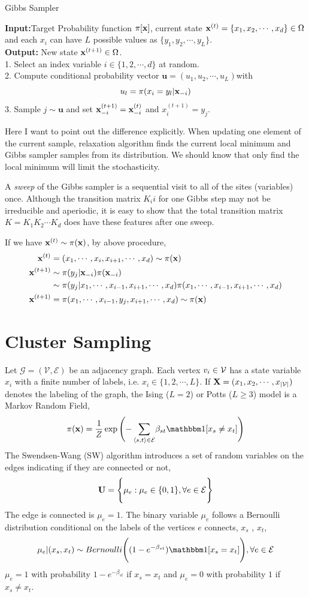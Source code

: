 \documentclass{article}
\begin{document}
\begin{algorithm}
\caption{Gibbs Sampler}
\label{algo:gibbs}
    \textbf{Input:}Target Probability function $\pi[\mathbf{x}]$, current state $\mathbf{x}^{(t)}=\{x_1,x_2,\cdots,x_d\}\in\Omega$ and each $x_i$ can have $L$ possible values as $\{y_1,y_2,\cdots,y_L\}$.\\
    \textbf{Output:} New state $\mathbf{x}^{(t+1)}\in\Omega$.\\
    1. Select an index variable $i\in\{1,2,\cdots,d\}$ at random.\\
    2. Compute conditional probability vector $\mathbf{u}=(u_1,u_2,\cdots,u_L)$with 
    \[u_l=\pi(x_i=y_l|\mathbf{x}_{-i})\]
    3. Sample $j\sim\mathbf{u}$ and set $\mathbf{x}^{(t+1)}_{-i}=\mathbf{x}^{(t)}_{-i}$ and $x^{(t+1)}_{i}=y_j$.
\end{algorithm}

Here I want to point out the difference explicitly. When updating one element of the current sample, relaxation algorithm finds the current local minimum and Gibbs sampler samples from its distribution. We should know that only find the local minimum will limit the stochasticity.

A \textit{sweep} of the Gibbs sampler is a sequential visit to all of the sites (variables) once.
Although the transition matrix $K_ii$ for one Gibbs step may not be irreducible and aperiodic, it is easy to show that the total transition matrix $K = K_1K_2\cdots K_d$ does have these features after one sweep. 

If we have $\mathbf{x}^{(t)}\sim\pi(\mathbf{x})$, by above procedure,
\begin{align*}
\mathbf{x}^{(t)}&=(x_1,\cdots,x_i,x_{i+1},\cdots,x_d)\sim \pi(\mathbf{x})\\
\mathbf{x}^{(t+1)}&\sim\pi(y_j|\mathbf{x}_{-i})\pi(\mathbf{x}_{-i})\\
&\sim\pi(y_j|x_1,\cdots,x_{i-1},x_{i+1},\cdots,x_d)\pi(x_1,\cdots,x_{i-1},x_{i+1},\cdots,x_d)\\
\mathbf{x}^{(t+1)}&= \pi(x_1,\cdots,x_{i-1},y_j,x_{i+1},\cdots,x_d)\sim \pi(\mathbf{x})
\end{align*}

\section{Cluster Sampling}
Let $\mathcal{G}=(\mathcal{V},\mathcal{E})$ be an adjacency graph. Each vertex $v_i\in\mathcal{V}$ has a state variable $x_i$ with a finite number of labels, i.e. $x_i\in\{1,2,\cdots,L\}$. If $\mathbf{X} = (x_1,x_2,\cdots,x_{|\mathcal{V}|})$ denotes the labeling of the graph, the Ising ($L=2$) or Potts ($L\ge3$) model is a Markov Random Field,
\[\pi(\xx)=\frac{1}{Z}\exp\Bigg({-\sum_{\epair{s,t}\in\edge}}\beta_{st}\indicator{x_s\neq x_t}\Bigg)\]
The Swendsen-Wang (SW) algorithm introduces a set of random variables on the edges indicating if they are connected or not,
\[\mathbf{U}=\Bigg\{\mu_e:\mu_e\in\{0,1\},\forall e\in\mathcal{E}\Bigg\}\]
The edge is connected is $\mu_e=1$. The binary variable $\mu_e$
follows a Bernoulli distribution conditional on the labels of the vertices $e$ connects, $x_s$ , $x_t$,
\[\mu_e|(x_s,x_t)\sim Bernoulli\Bigg((1-e^{-\beta_{st}})\indicator{x_s=x_t}\Bigg),\forall e\in\edge\] 
$\mu_e=1$ with probability $1-e^{-\beta_{st}}$ if $x_s=x_t$ and $\mu_e=0$ with probability $1$ if $x_s\neq x_t$. 
\end{document}
